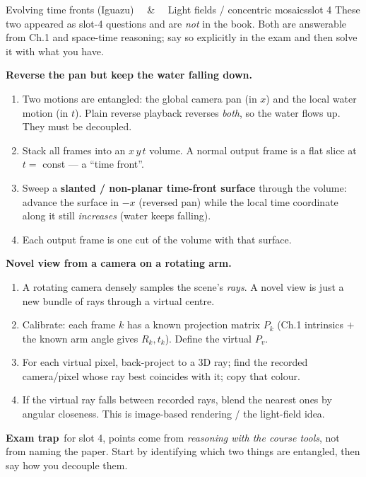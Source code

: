 \documentclass[9pt,a4paper]{extarticle}
\newcommand{\TRAP}{\par\smallskip\textbf{\color{cTrap}Exam trap}\ }
\begin{document}
\begin{card}{Evolving time fronts (Iguazu) \ \ \& \ \ Light fields / concentric mosaics}{slot 4}
These two appeared as slot-4 questions and are \emph{not} in the book. Both are answerable from Ch.1 and space-time reasoning; say so explicitly in the exam and then solve it with what you have.

\smallskip
\textbf{Reverse the pan but keep the water falling down.}
\begin{enumerate}
  \item Two motions are entangled: the global camera pan (in $x$) and the local water motion (in $t$). Plain reverse playback reverses \emph{both}, so the water flows up. They must be decoupled.
  \item Stack all frames into an $x\,y\,t$ volume. A normal output frame is a flat slice at $t=$ const --- a ``time front''.
  \item Sweep a \textbf{slanted / non-planar time-front surface} through the volume: advance the surface in $-x$ (reversed pan) while the local time coordinate along it still \emph{increases} (water keeps falling).
  \item Each output frame is one cut of the volume with that surface.
\end{enumerate}

\smallskip
\textbf{Novel view from a camera on a rotating arm.}
\begin{enumerate}
  \item A rotating camera densely samples the scene's \emph{rays}. A novel view is just a new bundle of rays through a virtual centre.
  \item Calibrate: each frame $k$ has a known projection matrix $P_k$ (Ch.1 intrinsics $+$ the known arm angle gives $R_k,t_k$). Define the virtual $P_v$.
  \item For each virtual pixel, back-project to a 3D ray; find the recorded camera/pixel whose ray best coincides with it; copy that colour.
  \item If the virtual ray falls between recorded rays, blend the nearest ones by angular closeness. This is image-based rendering / the light-field idea.
\end{enumerate}
\TRAP for slot 4, points come from \emph{reasoning with the course tools}, not from naming the paper. Start by identifying which two things are entangled, then say how you decouple them.
\end{card}

\end{document}

